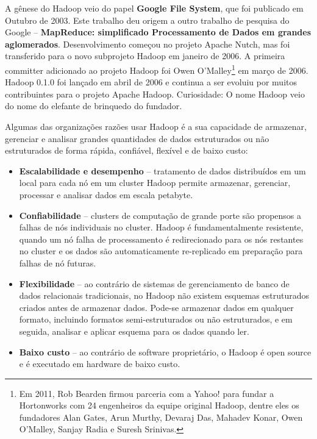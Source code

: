 \documentclass[a4paper,11pt]{article}
\begin{document}
A gênese do Hadoop veio do papel \textbf{Google File System}, que foi publicado em Outubro de 2003. Este trabalho deu origem a outro trabalho de pesquisa do Google – \textbf{MapReduce: simplificado Processamento de Dados em grandes aglomerados}. Desenvolvimento começou no projeto Apache Nutch, mas foi transferido para o novo subprojeto Hadoop em janeiro de 2006. A primeira committer adicionado ao projeto Hadoop foi Owen O’Malley\footnote{Em 2011, Rob Bearden firmou parceria com a Yahoo! para fundar a Hortonworks com 24 engenheiros da equipe original Hadoop, dentre eles os fundadores Alan Gates, Arun Murthy, Devaraj Das, Mahadev Konar, Owen O’Malley, Sanjay Radia e Suresh Srinivas.} em março de 2006. Hadoop 0.1.0 foi lançado em abril de 2006 e continua a ser evoluiu por muitos contribuintes para o projeto Apache Hadoop. Curiosidade: O nome Hadoop veio do nome do elefante de brinquedo do fundador.

Algumas das organizações razões usar Hadoop é a sua capacidade de armazenar, gerenciar e analisar grandes quantidades de dados estruturados ou não estruturados de forma rápida, confiável, flexível e de baixo custo: \vspace{-1em}
\begin{itemize}
	\item \textbf{Escalabilidade e desempenho} – tratamento de dados distribuídos em um local para cada nó em um cluster Hadoop permite armazenar, gerenciar, processar e analisar dados em escala petabyte.
	\item \textbf{Confiabilidade} – clusters de computação de grande porte são propensos a falhas de nós individuais no cluster. Hadoop é fundamentalmente resistente, quando um nó falha de processamento é redirecionado para os nós restantes no cluster e os dados são automaticamente re-replicado em preparação para falhas de nó futuras.
	\item \textbf{Flexibilidade} – ao contrário de sistemas de gerenciamento de banco de dados relacionais tradicionais, no Hadoop não existem esquemas estruturados criados antes de armazenar dados. Pode-se armazenar dados em qualquer formato, incluindo formatos semi-estruturados ou não estruturados, e em seguida, analisar e aplicar esquema para os dados quando ler.
	\item \textbf{Baixo custo} – ao contrário de software proprietário, o Hadoop é open source e é executado em hardware de baixo custo.
\end{itemize}
\end{document}

